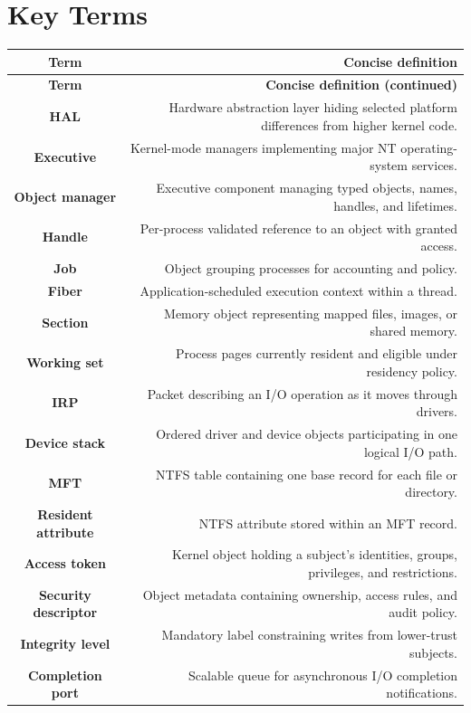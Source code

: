 \documentclass[10pt,letterpaper]{article}
\begin{document}
\section*{Key Terms}
\small
\begin{longtable}{C N}
\color{white}\textbf{Term} & \color{white}\textbf{Concise definition}\\
\endfirsthead
{}\color{white}\textbf{Term} & \color{white}\textbf{Concise definition (continued)}\\
\endhead
\textbf{HAL} & Hardware abstraction layer hiding selected platform differences from higher kernel code.\\\hline
\textbf{Executive} & Kernel-mode managers implementing major NT operating-system services.\\\hline
\textbf{Object manager} & Executive component managing typed objects, names, handles, and lifetimes.\\\hline
\textbf{Handle} & Per-process validated reference to an object with granted access.\\\hline
\textbf{Job} & Object grouping processes for accounting and policy.\\\hline
\textbf{Fiber} & Application-scheduled execution context within a thread.\\\hline
\textbf{Section} & Memory object representing mapped files, images, or shared memory.\\\hline
\textbf{Working set} & Process pages currently resident and eligible under residency policy.\\\hline
\textbf{IRP} & Packet describing an I/O operation as it moves through drivers.\\\hline
\textbf{Device stack} & Ordered driver and device objects participating in one logical I/O path.\\\hline
\textbf{MFT} & NTFS table containing one base record for each file or directory.\\\hline
\textbf{Resident attribute} & NTFS attribute stored within an MFT record.\\\hline
\textbf{Access token} & Kernel object holding a subject's identities, groups, privileges, and restrictions.\\\hline
\textbf{Security descriptor} & Object metadata containing ownership, access rules, and audit policy.\\\hline
\textbf{Integrity level} & Mandatory label constraining writes from lower-trust subjects.\\\hline
\textbf{Completion port} & Scalable queue for asynchronous I/O completion notifications.\\\hline
\end{longtable}
\normalsize
\end{document}
